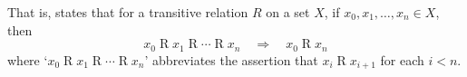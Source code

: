 That is,  states that for a transitive relation $R$ on a set $X$, if $x_0, x_1, \dots, x_n \in X$, then
\[ x_0 \mathrel{R} x_1 \mathrel{R} \cdots \mathrel{R} x_n \quad \Rightarrow \quad x_0 \mathrel{R} x_n \]
where `$x_0 \mathrel{R} x_1 \mathrel{R} \cdots  \mathrel{R} x_n$' abbreviates the assertion that $x_i \mathrel{R} x_{i+1}$ for each $i < n$.

